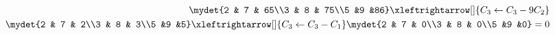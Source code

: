 \begin{align}
\mydet{2 & 7 & 65\\3 & 8 & 75\\5 &9 &86}
\xleftrightarrow[]{C_3 \leftarrow C_3- 9C_2 }
\\
\mydet{2 & 7 & 2\\3 & 8 & 3\\5 &9 &5}
\xleftrightarrow[]{C_3 \leftarrow C_3- C_{1} }
\mydet{2 & 7 & 0\\3 & 8 & 0\\5 &9 &0}=0
\end{align}
%
